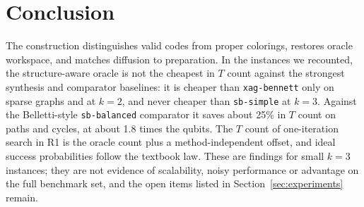 \documentclass[sigconf, natbib]{acmart}
\begin{document}
\section{Conclusion}
\label{sec:conclusion}
The construction distinguishes valid codes from proper colorings, restores oracle workspace, and matches diffusion to preparation. In the instances we recounted, the structure-aware oracle is not the cheapest in $T$ count against the strongest synthesis and comparator baselines: it is cheaper than \texttt{xag-bennett} only on sparse graphs and at $k=2$, and never cheaper than \texttt{sb-simple} at $k=3$. Against the Belletti-style \texttt{sb-balanced} comparator it saves about 25\% in $T$ count on paths and cycles, at about 1.8 times the qubits. The $T$ count of one-iteration search in R1 is the oracle count plus a method-independent offset, and ideal success probabilities follow the textbook law. These are findings for small $k=3$ instances; they are not evidence of scalability, noisy performance or advantage on the full benchmark set, and the open items listed in Section~\ref{sec:experiments} remain.



\end{document}
